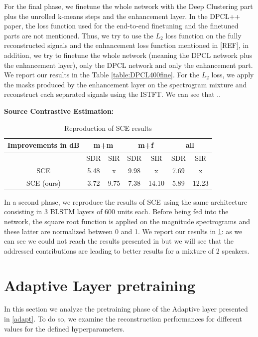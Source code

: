 \documentclass[master, tikz, final,11pt, dvipdfmx]{iscs-thesis}
\begin{document}
For the final phase, we finetune the whole network with the Deep Clustering part plus the unrolled k-means steps and the enhancement layer. In the DPCL++ paper, the loss function used for the end-to-end finetuning and the finetuned parts are not mentioned. Thus, we try to use the $L_2$ loss function on the fully reconstructed signals and the enhancement loss function mentioned in [REF], in addition, we try to finetune the whole network (meaning the DPCL network plus the enhancement layer), only the DPCL network and only the enhancement part. We report our results in the Table \ref{table:DPCL400fine}. For the $L_2$ loss, we apply the masks produced by the enhancement layer on the spectrogram mixture and reconstruct each separated signals using the ISTFT. We can see that ..

\textbf{Source Contrastive Estimation:} 

\begin{table}[ht]
\centering
\begin{tabular}{c|c|c|c|c|c|c}
Improvements in dB & \multicolumn{2}{c|}{m+m} & \multicolumn{2}{c|}{m+f} & \multicolumn{2}{c}{all} \\ 
\hline 
 & SDR & SIR & SDR & SIR & SDR & SIR \\ 
\hline 
SCE \cite{SCE} & 5.48 & x & 9.98 & x & 7.69 & x \\ 
SCE (ours) & 3.72 & 9.75 & 7.38 & 14.10 & 5.89 & 12.23 \\ 
\end{tabular}
\caption{Reproduction of SCE results}
\label{table:SCErepro}
\end{table}

In a second phase, we reproduce the results of SCE \cite{SCE} using the same architecture consisting in 3 BLSTM layers of 600 units each. Before being fed into the network, the square root function is applied on the magnitude spectrograms and these latter are normalized between 0 and 1. We report our results in \ref{table:SCErepro}: as we can see we could not reach the results presented in \cite{SCE} but we will see that the addressed contributions are leading to better results for a mixture of 2 speakers.

\section{Adaptive Layer pretraining}

In this section we analyze the pretraining phase of the Adaptive layer presented in \autoref{adapt}. To do so, we examine the reconstruction performances for different values for the defined hyperparameters.
\end{document}
